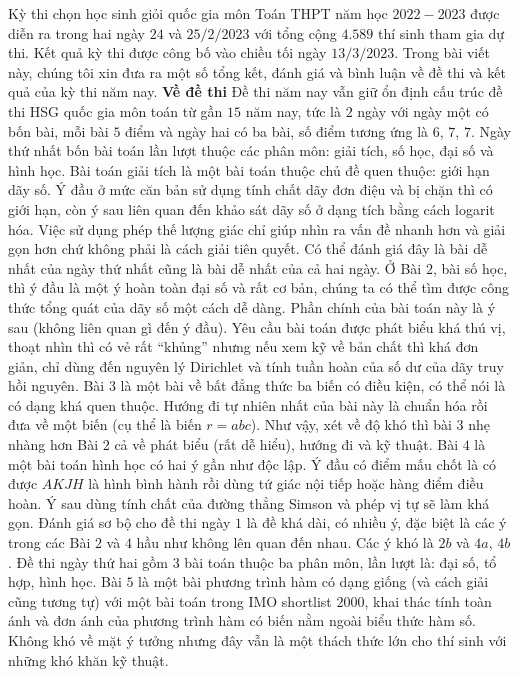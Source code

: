 \begin{multicols}{2}
	Kỳ thi chọn học sinh giỏi quốc gia môn Toán THPT năm học $2022-2023$ được diễn ra trong hai ngày $24$ và $25/2/2023$ với tổng cộng $4{.}589$ thí sinh tham gia dự thi. Kết quả kỳ thi được công bố vào chiều tối ngày $13/3/2023$. Trong bài viết này, chúng tôi xin đưa ra một số tổng kết, đánh giá và bình luận về đề thi và kết quả của kỳ thi năm nay.
	\vskip 0.1cm
	\textbf{Về đề thi}
	\vskip 0.1cm
	Đề thi năm nay vẫn giữ ổn định cấu trúc đề thi HSG quốc gia môn toán từ gần $15$ năm nay, tức là $2$ ngày với ngày một có bốn bài, mỗi bài $5$ điểm và ngày hai có ba bài, số điểm tương ứng là $6$, $7$, $7$.
	\vskip 0.1cm 
	Ngày thứ nhất bốn bài toán lần lượt thuộc các phân môn: giải tích, số học, đại số và hình học. Bài toán giải tích là một bài toán thuộc chủ đề quen thuộc: giới hạn dãy số. Ý đầu ở mức căn bản sử dụng tính chất dãy đơn điệu và bị chặn thì có giới hạn, còn ý sau liên quan đến khảo sát dãy số ở dạng tích bằng cách logarit hóa. Việc sử dụng phép thế lượng giác chỉ giúp nhìn ra vấn đề nhanh hơn và giải gọn hơn chứ không phải là cách giải tiên quyết. Có thể đánh giá đây là bài dễ nhất của ngày thứ nhất cũng là bài dễ nhất của cả hai ngày. 
	\vskip 0.1cm
	Ở Bài $2$, bài số học, thì ý đầu là một ý hoàn toàn đại số và rất cơ bản, chúng ta có thể tìm được công thức tổng quát của dãy số một cách dễ dàng. Phần chính của bài toán này là ý sau (không liên quan gì đến ý đầu). Yêu cầu bài toán được phát biểu khá thú vị, thoạt nhìn thì có vẻ rất “khủng” nhưng nếu xem kỹ về bản chất thì khá đơn giản, chỉ dùng đến nguyên lý Dirichlet và tính tuần hoàn của số dư của dãy truy hồi nguyên. 
	\vskip 0.1cm
	Bài $3$ là một bài về bất đẳng thức ba biến có điều kiện, có thể nói là có dạng khá quen thuộc. Hướng đi tự nhiên nhất của bài này là chuẩn hóa rồi đưa về một biến (cụ thể là biến $r = abc$). Như vậy, xét về độ khó thì bài $3$ nhẹ nhàng hơn Bài $2$ cả về phát biểu (rất dễ hiểu), hướng đi và kỹ thuật.  
	\vskip 0.1cm
	Bài $4$ là một bài toán hình học có hai ý gần như độc lập. Ý đầu có điểm mấu chốt là có được $AKJH$ là hình bình hành rồi dùng tứ giác nội tiếp hoặc hàng điểm điều hoàn. Ý sau dùng tính chất của đường thẳng Simson và phép vị tự sẽ làm khá gọn. 
	\vskip 0.1cm
	Đánh giá sơ bộ cho đề thi ngày $1$ là đề khá dài, có nhiều ý, đặc biệt là các ý trong các Bài $2$ và $4$ hầu như không lên quan đến nhau. Các ý khó là $2b$ và $4a$, $4b$.
	\vskip 0.1cm 
	Đề thi ngày thứ hai gồm $3$ bài toán thuộc ba phân môn, lần lượt là: đại số, tổ hợp, hình học.
	\vskip 0.1cm
	Bài $5$ là một bài phương trình hàm có dạng giống (và cách giải cũng tương tự) với một bài toán trong IMO shortlist $2000$, khai thác tính toàn ánh và đơn ánh của phương trình hàm có biến nằm ngoài biểu thức hàm số. Không khó về mặt ý tưởng nhưng đây vẫn là một thách thức lớn cho thí sinh với những khó khăn kỹ thuật.   

\end{multicols}
